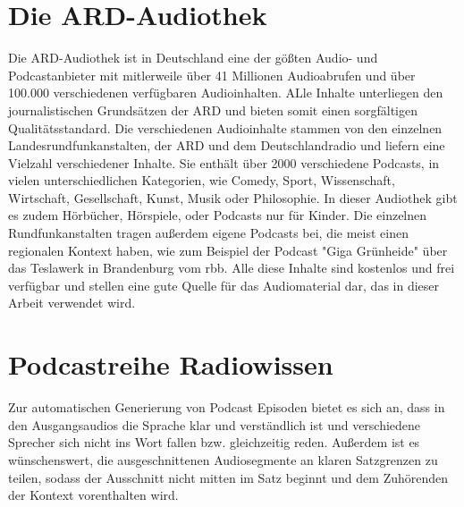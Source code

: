 


\section{Die ARD-Audiothek}

Die ARD-Audiothek ist in Deutschland eine der gößten Audio- und Podcastanbieter mit mitlerweile über 41 Millionen Audioabrufen und über 100.000 verschiedenen verfügbaren Audioinhalten. 
ALle Inhalte unterliegen den journalistischen Grundsätzen der ARD und bieten somit einen sorgfältigen Qualitätsstandard. 
Die verschiedenen Audioinhalte stammen von den einzelnen Landesrundfunkanstalten, der ARD und dem Deutschlandradio und liefern eine Vielzahl verschiedener Inhalte.
Sie enthält über 2000 verschiedene Podcasts, in vielen unterschiedlichen Kategorien, wie Comedy, Sport, Wissenschaft, Wirtschaft, Gesellschaft, Kunst, Musik oder Philosophie. 
In dieser Audiothek gibt es zudem Hörbücher, Hörspiele, oder Podcasts nur für Kinder.
Die einzelnen Rundfunkanstalten tragen außerdem eigene Podcasts bei, die meist einen regionalen Kontext haben, wie zum Beispiel der Podcast "Giga Grünheide" über das Teslawerk in Brandenburg vom rbb.
Alle diese Inhalte sind kostenlos und frei verfügbar und stellen eine gute Quelle für das Audiomaterial dar, das in dieser Arbeit verwendet wird.








\section{Podcastreihe Radiowissen}

Zur automatischen Generierung von Podcast Episoden bietet es sich an, dass in den Ausgangsaudios die Sprache klar und verständlich ist und verschiedene Sprecher sich nicht ins Wort fallen bzw. gleichzeitig reden.
Außerdem ist es wünschenswert, die ausgeschnittenen Audiosegmente an klaren Satzgrenzen zu teilen, sodass der Ausschnitt nicht mitten im Satz beginnt und dem Zuhörenden der Kontext vorenthalten wird. 

